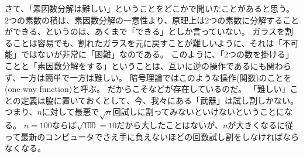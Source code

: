 さて、「素因数分解は難しい」ということをどこかで聞いたことがあると思う。
2つの素数の積は、素因数分解の一意性より、原理上は2つの素数に分解することができる、というのは、あくまで「できる」としか言っていない。
ガラスを割ることは容易でも、割れたガラスを元に戻すことが難しいように、それは「不可能」ではないが非常に「困難」なのである。
このように、「2つの数を掛ける」ことと「素因数分解をする」ということは、互いに逆の操作であるにも関わらず、一方は簡単で一方は難しい。
暗号理論ではこのような操作(関数)のことを(one-way function)と呼ぶ。
だからこそなどが存在しているのだ。
「難しい」ことの定義は脇に置いておくとして、今、我々にある「武器」は試し割しかない。
つまり、$n$に対して最悪で$\sqrt{n}$回試しに割ってみないといけないということになる。
$n=100$ならば$\sqrt{100}=10$だから大したことはないが、$n$が大きくなるに従って最新のコンピュータでさえ手に負えないほどの回数試し割をしなければならなくなる。

